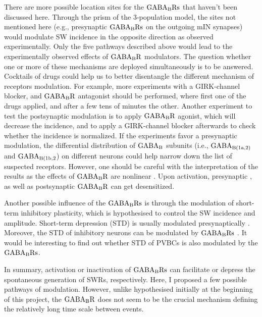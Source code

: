     There are more possible location sites for the $\rm GABA_BRs$ that haven't
    been discussed here. Through the prism of the 3-population model, the sites
    not mentioned here (e.g., presynaptic $\rm GABA_BRs$ on the outgoing mIN
    synapses) would modulate SW incidence in the opposite direction as observed
    experimentally.  Only the five pathways described above would lead to the
    experimentally observed effects of $\rm GABA_BR$ modulators. The question
    whether one or more of these mechanisms are deployed simultaneously is to
    be answered.  Cocktails of drugs could help us to better disentangle the
    different mechanism of receptors modulation. For example, more experiments
    with a GIRK-channel blocker, and $\rm GABA_BR$ antagonist should be
    performed, where first one of the drugs applied, and after a few tens of
    minutes the other. Another experiment to test the postsynaptic modulation
    is to apply $\rm GABA_BR$ agonist, which will decrease the incidence, and
    to apply a GIRK-channel blocker afterwards to check whether the incidence
    is normalized. If the experiments favor a presynaptic modulation, the
    differential distribution of $\rm GABA_B$ subunits (i.e., $\rm
    GABA_{B(1a,2)}$ and $\rm GABA_{B(1b,2}$) on different neurons could help
    narrow down the list of suspected receptors. However, one should be careful
    with the interpretation of the results as the effects of $\rm GABA_BR$ are
    nonlinear \citep{Brenowitz1998}. Upon activation, presynaptic
    \citep{Schwenk2010}, as well as postsynaptic \citep{Wetherington2002} $\rm
    GABA_BR$ can get desensitized.

    Another possible influence of the $\rm GABA_{B}Rs$ is through the
    modulation of short-term inhibitory plasticity, which is hypothesised to
    control the SW incidence and amplitude. Short-term depression (STD) is
    usually modulated presynaptically \citep{Kraushaar2000}. Moreover, the STD
    of inhibitory neurons can be modulated by $\rm GABA_BRs$ \citep{Lei2003}.
    It would be interesting to find out whether STD of PVBCs is also modulated
    by the $\rm GABA_BRs$.

    In summary, activation or inactivation of $\rm GABA_BRs$ can facilitate or
    depress the spontaneous generation of SWRs, respectively. Here, I proposed
    a few possible pathways of modulation. However, unlike hypothesised
    initially at the beginning of this project, the $\rm GABA_BR$ does not seem
    to be the crucial mechanism defining the relatively long time scale between
    events.
        
